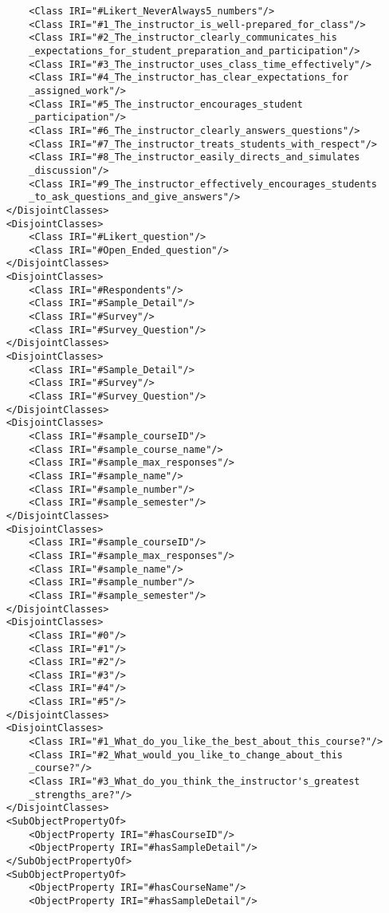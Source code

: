 \begin{lstlisting}
        <Class IRI="#Likert_NeverAlways5_numbers"/>
        <Class IRI="#1_The_instructor_is_well-prepared_for_class"/>
        <Class IRI="#2_The_instructor_clearly_communicates_his
        _expectations_for_student_preparation_and_participation"/>
        <Class IRI="#3_The_instructor_uses_class_time_effectively"/>
        <Class IRI="#4_The_instructor_has_clear_expectations_for
        _assigned_work"/>
        <Class IRI="#5_The_instructor_encourages_student
        _participation"/>
        <Class IRI="#6_The_instructor_clearly_answers_questions"/>
        <Class IRI="#7_The_instructor_treats_students_with_respect"/>
        <Class IRI="#8_The_instructor_easily_directs_and_simulates
        _discussion"/>
        <Class IRI="#9_The_instructor_effectively_encourages_students
        _to_ask_questions_and_give_answers"/>
    </DisjointClasses>
    <DisjointClasses>
        <Class IRI="#Likert_question"/>
        <Class IRI="#Open_Ended_question"/>
    </DisjointClasses>
    <DisjointClasses>
        <Class IRI="#Respondents"/>
        <Class IRI="#Sample_Detail"/>
        <Class IRI="#Survey"/>
        <Class IRI="#Survey_Question"/>
    </DisjointClasses>
    <DisjointClasses>
        <Class IRI="#Sample_Detail"/>
        <Class IRI="#Survey"/>
        <Class IRI="#Survey_Question"/>
    </DisjointClasses>
    <DisjointClasses>
        <Class IRI="#sample_courseID"/>
        <Class IRI="#sample_course_name"/>
        <Class IRI="#sample_max_responses"/>
        <Class IRI="#sample_name"/>
        <Class IRI="#sample_number"/>
        <Class IRI="#sample_semester"/>
    </DisjointClasses>
    <DisjointClasses>
        <Class IRI="#sample_courseID"/>
        <Class IRI="#sample_max_responses"/>
        <Class IRI="#sample_name"/>
        <Class IRI="#sample_number"/>
        <Class IRI="#sample_semester"/>
    </DisjointClasses>
    <DisjointClasses>
        <Class IRI="#0"/>
        <Class IRI="#1"/>
        <Class IRI="#2"/>
        <Class IRI="#3"/>
        <Class IRI="#4"/>
        <Class IRI="#5"/>
    </DisjointClasses>
    <DisjointClasses>
        <Class IRI="#1_What_do_you_like_the_best_about_this_course?"/>
        <Class IRI="#2_What_would_you_like_to_change_about_this
        _course?"/>
        <Class IRI="#3_What_do_you_think_the_instructor's_greatest
        _strengths_are?"/>
    </DisjointClasses>
    <SubObjectPropertyOf>
        <ObjectProperty IRI="#hasCourseID"/>
        <ObjectProperty IRI="#hasSampleDetail"/>
    </SubObjectPropertyOf>
    <SubObjectPropertyOf>
        <ObjectProperty IRI="#hasCourseName"/>
        <ObjectProperty IRI="#hasSampleDetail"/>

\end{lstlisting}
